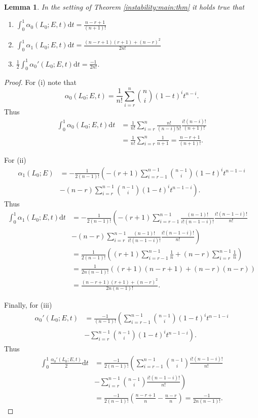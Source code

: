 \documentclass[10pt,letterpaper]{amsart}
\providecommand{\binom}[2]{{#1\choose#2}}
\newtheorem{lemma}[theorem]{Lemma}
\theoremstyle{definition}
\numberwithin{equation}{section}
\begin{document}
\begin{lemma}\label{slope:invariants:a:0}
In the setting of Theorem \ref{instability:main:thm} it holds true that
\begin{enumerate}
\item[(i)]{
$\int_0^1 \alpha_0(L_0;E,t) \mathrm{d}t = \frac{n-r+1}{(n+1)!}$
}
\item[(ii)]{
$ \int_0^1 \alpha_1(L_0;E,t) \mathrm{d}t = \frac{(n-r+1)(r+1)+(n-r)^2}{2n!}$
}
\item[(iii)]{
$\frac{1}{2} \int_0^1 \alpha_0'(L_0;E,t) \mathrm{d}t =  \frac{- 1}{2n!}$.
}
\end{enumerate}
\end{lemma}
\begin{proof}
For (i) note that
$$
\alpha_0(L_0;E,t) = \frac{1}{n!} \sum_{i=r}^n \binom{n}{i} (1-t)^i t^{n-i} \text{.}
$$
Thus
\begin{align*}
\int_0^1 \alpha_0(L_0;E,t)\mathrm{d}t &= \frac{1}{n!} \sum_{i=r}^n \frac{n!}{(n-i)!i!} \frac{i! (n-i)!}{(n+1)!} \\
& = \frac{1}{n!} \sum_{i=r}^n \frac{1}{n+1} 
= \frac{n-r+1}{(n+1)!} \text{.}
\end{align*}

For (ii)
\begin{align*}
\alpha_1(L_0;E) & = - \frac{1}{2(n-1)!} \left( -(r+1) \sum_{i=r-1}^{n-1} \binom{n-1}{i}(1-t)^i t^{n-1-i} \right. \\ 
& \left. - (n-r) \sum_{i=r}^{n-1}\binom{n-1}{i}(1-t)^it^{n-1-i}\right) \text{.}
\end{align*}
Thus
\begin{align*}
\int_0^1 \alpha_1(L_0;E,t)\mathrm{d}t &= - \frac{1}{2(n-1)!} \left( -(r+1) \sum_{i=r-1}^{n-1} \frac{(n-1)!}{i!(n-1-i)!} \frac{i!(n-1-i)!}{n!} \right. \\
& 
\left.  - (n-r) \sum_{i=r}^{n-1} \frac{ (n-1)!}{i!(n-1-i)!} \frac{i!(n-1-i)!}{n!} \right) \\
&= \frac{1}{2(n-1)!} \left( (r+1) \sum_{i=r-1}^{n-1} \frac{1}{n} + (n-r) \sum_{i=r}^{n-1} \frac{1}{n} \right) \\
& = \frac{1}{2n(n-1)!} \left( (r+1)(n-r+1) + (n-r)(n-r) \right) \\
& = \frac{ (n-r+1)(r+1) + (n-r)^2}{2n (n-1)! } \text{.}
\end{align*}

Finally, for (iii) 
\begin{align*}
\alpha_0'(L_0;E,t) &= \frac{-1}{(n-1)!} \left( \sum_{i=r-1}^{n-1} \binom{n-1}{i} (1 - t)^it^{n-1-i} \right. \\
& \left. - \sum_{i=r}^{n-1}\binom{n-1}{i} (1 - t)^i t^{n-1-i} \right) \text{.}
\end{align*}
Thus
\begin{align*}
\int_0^1 \frac{\alpha_0'(L_0;E,t)}{2} \mathrm{d}t &= \frac{-1}{2(n-1)!} \left( \sum_{i = r-1}^{n-1} \binom{n-1}{i} \frac{i!(n-1-i)!}{n!} \right. \\
& \left. - \sum_{i=r}^{n-1} \binom{n-1}{i} \frac{i!(n-1-i)!}{n!} \right) \\
&= \frac{-1}{2(n-1)!} \left( \frac{n-r+1}{n} - \frac{n-r}{n} \right) = \frac{-1}{2n(n-1)!} \text{.}
\end{align*}
\end{proof}
\end{document}
